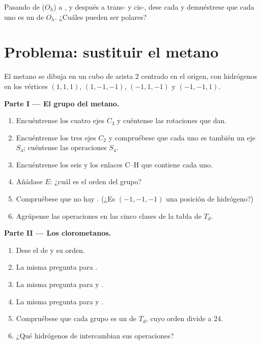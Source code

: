 \begin{exercise}[$\star\star\star$]\label{exo:b3:point-groups:12}
Pasando de  ($O_h$) a , y después a trans- y
cis-, dese cada  y demuéstrese que cada uno es un  de
$O_h$. ¿Cuáles pueden ser polares?
\end{exercise}

\section{Problema: sustituir el metano}

\begin{problem}
\label{pb:b3:point-groups:1}
El metano se dibuja en un cubo de arista 2 centrado en el origen, con hidrógenos
en los vértices $(1,1,1)$, $(1,-1,-1)$, $(-1,1,-1)$ y $(-1,-1,1)$.

\medskip\noindent\textbf{Parte I --- El grupo del metano.}
\begin{enumerate}
  \item Encuéntrense los cuatro ejes $C_3$ y cuéntense las rotaciones que dan.
  \item Encuéntrense los tres ejes $C_2$ y compruébese que cada uno es también un eje $S_4$;
        cuéntense las operaciones $S_4$.
  \item Encuéntrense los seis  y los enlaces C--H que contiene cada uno.
  \item Añádase $E$: ¿cuál es el orden del grupo?
  \item Compruébese que no hay . (¿Es $(-1,-1,-1)$ una posición de
        hidrógeno?)
  \item Agrúpense las operaciones en las cinco clases de la tabla de $T_d$.
\end{enumerate}

\medskip\noindent\textbf{Parte II --- Los clorometanos.}
\begin{enumerate}[resume]
  \item Dese el  de  y su orden.
  \item La misma pregunta para .
  \item La misma pregunta para  y .
  \item La misma pregunta para  y .
  \item Compruébese que cada grupo es un  de $T_d$, cuyo orden divide a 24.
  \item ¿Qué hidrógenos de  intercambian sus operaciones?
\end{enumerate}


\end{problem}

